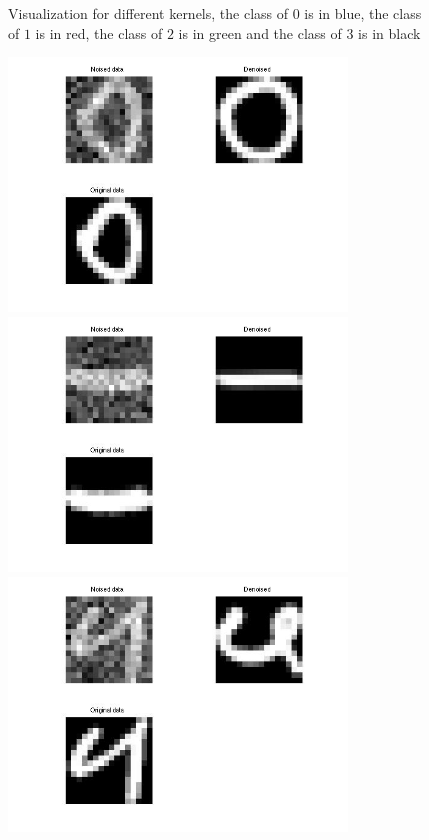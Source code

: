 \begin{figure}[H]
	\label{fig:gaussker2}
	\endminipage \hfill
	\caption{Visualization for different kernels, the class of $0$ is in blue, the class of $1$ is in red, the class of $2$ is in green and the class of $3$ is in black}
\end{figure} 
\begin{figure}[H]
	\includegraphics[width=9cm]{result0.jpg}
	\subcaption{}\label{fig:awesome_image1}
	\endminipage\hfill
	\includegraphics[width=9cm]{result1.jpg}
	\subcaption{}\label{fig:awesome_image2}
	\endminipage \\
	\includegraphics[width=9cm]{result2.jpg}

\end{figure}
